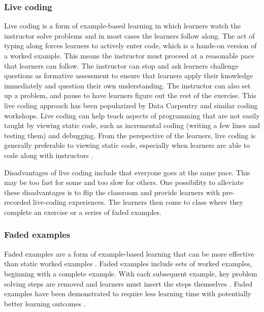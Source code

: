 \subsubsection{Live coding}\label{Livecoding}

Live coding is a form of example-based learning in which learners watch the instructor solve problems and in most cases the learners follow along. 
The act of typing along forces learners to actively enter code, which is a hands-on version of a worked example.
This means the instructor must proceed at a reasonable pace that learners can follow.
The instructor can stop and ask learners challenge questions as formative assessment to ensure that learners apply their knowledge immediately and question their own understanding. 
The instructor can also set up a problem, and pause to have learners figure out the rest of the exercise. 
This live coding approach has been popularized by Data Carpentry and similar coding workshops.
Live coding can help teach aspects of programming that are not easily taught by viewing static code, such as incremental coding (writing a few lines and testing them) and debugging. 
From the perspective of the learners, live coding is generally preferable to viewing static code, especially when learners are able to code along with instructors \citep{raj_role_2018}.


Disadvantages of live coding include that everyone goes at the same pace.
This may be too fast for some and too slow for others.
One possibility to alleviate these disadvantages is to flip the classroom and provide learners with pre-recorded live-coding experiences.
The learners then come to class where they complete an exercise or a series of faded examples. 


\subsubsection{Faded examples}\label{Fillable} 
Faded examples are a form of example-based learning that can be more effective than static worked examples \citep{schwonke_worked-example_2009}.
Faded examples include sets of worked examples, beginning with a complete example. 
With each subsequent example, key problem solving steps are removed and learners must insert the steps themselves \citep{renkl_toward_2014}. 
Faded examples have been demonstrated to require less learning time with potentially better learning outcomes \citep{schwonke_worked-example_2009}. 

